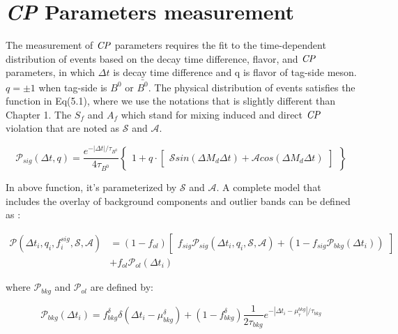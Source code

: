 \chapter{\textit{CP} Parameters measurement}
The measurement of $\it{CP}$ parameters requires the fit to the time-dependent distribution of events based on the decay time difference, flavor, and $\it{CP}$ parameters, in which $\Delta t$ is decay time difference and q is flavor of tag-side meson. $q = \pm 1$ when tag-side is $B^0$ or $\bar{B^0}$. The physical distribution of events satisfies the function in Eq(5.1), where we use the notations that is slightly different than Chapter 1. The $S_f$ and $A_f$ which stand for mixing induced and direct $\it{CP}$ violation that are noted as $\mathcal{S}$ and $\mathcal{A}$.

\begin{equation}
\mathcal{P}_{sig}(\Delta t, q ) = 
\frac{e^{-|\Delta t|/\tau_{B^0}}}{4\tau_{B^0}}
\begin{Bmatrix}
1 + q \cdot 
\begin{bmatrix}
\mathcal{S}sin(\Delta M_d \Delta t) + 
\mathcal{A}cos(\Delta M_d \Delta t)
\end{bmatrix}
\end{Bmatrix}
\end{equation}

In above function, it's parameterized by $\mathcal{S}$ and $\mathcal{A}$.
A complete model that includes the overlay of background components and outlier bands can be defined as : 

\begin{equation}
\begin{split}
\mathcal{P}(\Delta t_i,q_i,f_i^{sig},\mathcal{S},\mathcal{A})
&=(1-f_{ol})\begin{bmatrix}f_{sig}\mathcal{P}_{sig}(\Delta t_i,q_i,\mathcal{S},\mathcal{A})+(1-f_{sig}\mathcal{P}_{bkg}(\Delta t_i))
\end{bmatrix}\\
&+f_{ol}\mathcal{P}_{ol}(\Delta t_i)
\end{split}
\end{equation}

where $\mathcal{P}_{bkg}$ and $\mathcal{P}_{ol}$ are defined by: 

\begin{equation}
\mathcal{P}_{bkg} (\Delta t_i)=
f_{bkg}^{\delta}\delta(\Delta t_i-\mu_{bkg}^{\delta})+(1-f_{bkg}^{\delta})
\frac{1}{2\tau_{bkg}}e^{-|\Delta t_i-\mu_{\tau}^{bkg}|/\tau_{bkg}}
\end{equation}


